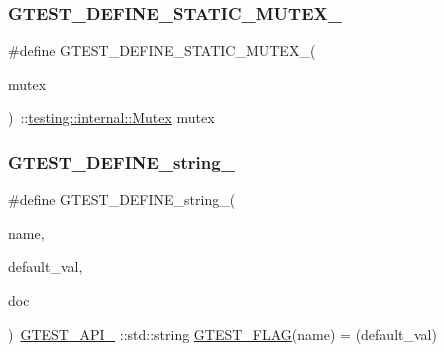 \mbox{\label{googletest-master_2googletest_2include_2gtest_2internal_2gtest-port_8h_a85d5cd679fdbe87383e7dfd1c6651eaa}} 
\subsubsection{\texorpdfstring{GTEST\_DEFINE\_STATIC\_MUTEX\_}{GTEST\_DEFINE\_STATIC\_MUTEX\_}}
{\footnotesize\ttfamily \#define G\+T\+E\+S\+T\+\_\+\+D\+E\+F\+I\+N\+E\+\_\+\+S\+T\+A\+T\+I\+C\+\_\+\+M\+U\+T\+E\+X\+\_\+(\begin{DoxyParamCaption}\item[{}]{mutex }\end{DoxyParamCaption})~\+::\mbox{\hyperlink{classtesting_1_1internal_1_1_mutex}{testing\+::internal\+::\+Mutex}} mutex}

\mbox{\label{googletest-master_2googletest_2include_2gtest_2internal_2gtest-port_8h_a885e18fe217a6e85553d408b99252c12}} 
\subsubsection{\texorpdfstring{GTEST\_DEFINE\_string\_}{GTEST\_DEFINE\_string\_}}
{\footnotesize\ttfamily \#define G\+T\+E\+S\+T\+\_\+\+D\+E\+F\+I\+N\+E\+\_\+string\+\_\+(\begin{DoxyParamCaption}\item[{}]{name,  }\item[{}]{default\+\_\+val,  }\item[{}]{doc }\end{DoxyParamCaption})~\mbox{\hyperlink{_obj__test_2lib_2googletest-release-1_88_81_2googletest_2include_2gtest_2internal_2gtest-port_8h_aa73be6f0ba4a7456180a94904ce17790}{G\+T\+E\+S\+T\+\_\+\+A\+P\+I\+\_\+}} \+::std\+::string \mbox{\hyperlink{_obj__test_2lib_2googletest-release-1_88_81_2googletest_2include_2gtest_2internal_2gtest-port_8h_a828f4e34a1c4b510da50ec1563e3562a}{G\+T\+E\+S\+T\+\_\+\+F\+L\+AG}}(name) = (default\+\_\+val)}

